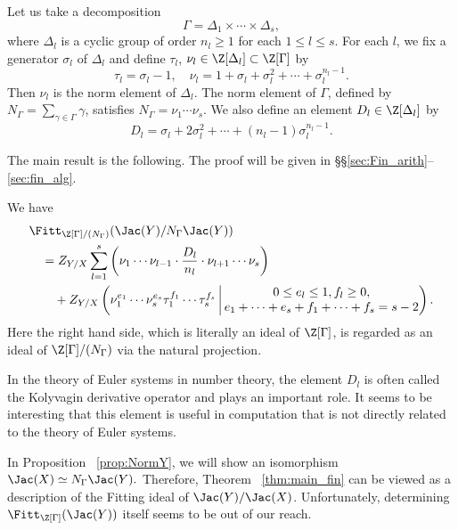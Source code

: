 Let us take a decomposition
\[
\Gamma = \Delta_1 \times \cdots \times \Delta_s,
\]
where $\Delta_l$ is a cyclic group of order $n_l \geq 1$ for each $1 \leq l \leq s$.
For each $l$, we fix a generator $\sigma_l$ of $\Delta_l$ and define $\tau_l$, $\nu_l \in \Z[\Delta_l] \subset \Z[\Gamma]$ by
\[
\tau_l = \sigma_l - 1,
\quad
\nu_l = 1 + \sigma_l + \sigma_l^2 + \cdots + \sigma_l^{n_l-1}.
\]
Then $\nu_l$ is the norm element of $\Delta_l$.
The norm element of $\Gamma$, defined by $N_{\Gamma} = \sum_{\gamma \in \Gamma} \gamma$, satisfies $N_{\Gamma} = \nu_1 \cdots \nu_s$.
We also define an element $D_l \in \Z[\Delta_l]$ by
\[
D_l = \sigma_l + 2 \sigma_l^2 + \cdots + (n_l-1) \sigma_l^{n_l-1}.
\]

The main result is the following.
The proof will be given in \S\S\ref{sec:Fin_arith}--\ref{sec:fin_alg}.

\begin{thm}\label{thm:main_fin}
We have
\begin{align}
& \Fitt_{\Z[\Gamma]/(N_{\Gamma})}(\Jac(Y)/N_{\Gamma}\Jac(Y))\\
& \quad = Z_{Y/X} \sum_{l=1}^s \left( \nu_1 \cdots \nu_{l-1} \cdot \frac{D_l}{n_l} \cdot \nu_{l+1} \cdots \nu_s \right) \\
& \quad \quad + Z_{Y/X} \left(\nu_1^{e_1} \cdots \nu_s^{e_s} \tau_1^{f_1} \cdots \tau_s^{f_s} \, \middle| \, \begin{matrix} 0 \leq e_l \leq 1, f_l \geq 0, \\ e_1 + \cdots + e_s + f_1 + \cdots + f_s = s- 2 \end{matrix} \right).
\end{align}
Here the right hand side, which is literally an ideal of $\Z[\Gamma]$, is regarded as an ideal of $\Z[\Gamma]/(N_{\Gamma})$ via the natural projection.
\end{thm}

\begin{rema}\label{rem:Kol}
In the theory of Euler systems in number theory, the element $D_l$ is often called the Kolyvagin derivative operator and plays an important role.
It seems to be interesting that this element is useful in computation that is not directly related to the theory of Euler systems.
\end{rema}

In Proposition ~\ref{prop:NormY}, we will show an isomorphism
$
\Jac(X) \simeq N_{\Gamma} \Jac(Y).
$
Therefore, Theorem ~\ref{thm:main_fin} can be viewed as a description of the Fitting ideal of $\Jac(Y)/\Jac(X)$.
Unfortunately, determining $\Fitt_{\Z[\Gamma]}(\Jac(Y))$ itself seems to be out of our reach.

